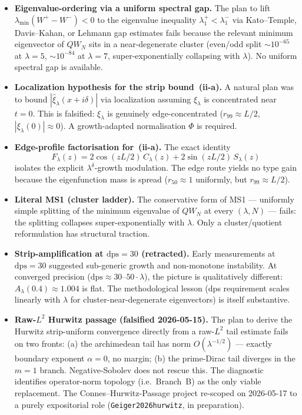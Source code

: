 \documentclass[12pt,a4paper]{article}
\theoremstyle{definition}
\theoremstyle{remark}
\begin{document}
\begin{itemize}
  \item \textbf{Eigenvalue-ordering via a uniform spectral gap.} The plan
    to lift $\lambda_{\min}(W^+-W^-)<0$ to the eigenvalue inequality
    $\lambda_1^+<\lambda_1^-$ via Kato--Temple, Davis--Kahan, or Lehmann
    gap estimates fails because the relevant minimum eigenvector of
    $QW_N$ sits in a near-degenerate cluster (even/odd split
    $\sim\!10^{-65}$ at $\lambda=5$, $\sim\!10^{-84}$ at $\lambda=7$,
    super-exponentially collapsing with $\lambda$). No uniform spectral
    gap is available.

  \item \textbf{Localization hypothesis for the strip bound~(ii-a).} A
    natural plan was to bound
    $|\hat\xi_\lambda(x+i\delta)|$ via localization assuming
    $\xi_\lambda$ is concentrated near $t=0$. This is falsified:
    $\xi_\lambda$ is genuinely edge-concentrated ($r_{99}\approx L/2$,
    $|\xi_\lambda(0)|\approx 0$). A growth-adapted normalisation $\Phi$
    is required.

  \item \textbf{Edge-profile factorisation for~(ii-a).} The exact identity
    \[
      F_\lambda(z)=2\cos(zL/2)\,C_\lambda(z)+2\sin(zL/2)\,S_\lambda(z)
    \]
    isolates the explicit $\lambda^\delta$-growth modulation. The edge
    route yields no type gain because the eigenfunction mass is spread
    ($r_{50}\approx 1$ uniformly, but $r_{99}\approx L/2$).

  \item \textbf{Literal MS1 (cluster ladder).} The conservative form of
    MS1 --- uniformly simple splitting of the minimum eigenvalue of
    $QW_N$ at every $(\lambda,N)$ --- fails: the splitting collapses
    super-exponentially with $\lambda$. Only a cluster/quotient
    reformulation has structural traction.

  \item \textbf{Strip-amplification at $\mathrm{dps}=30$ (retracted).}
    Early measurements at $\mathrm{dps}=30$ suggested sub-generic growth
    and non-monotone instability. At converged precision
    ($\mathrm{dps}\approx 30\text{--}50\cdot\lambda$), the picture is
    qualitatively different: $A_\lambda(0.4)\approx 1.004$ is flat. The
    methodological lesson (dps requirement scales linearly with $\lambda$
    for cluster-near-degenerate eigenvectors) is itself substantive.

  \item \textbf{Raw-$L^2$ Hurwitz passage (falsified 2026-05-15).} The
    plan to derive the Hurwitz strip-uniform convergence directly from a
    raw-$L^2$ tail estimate fails on two fronts: (a) the archimedean
    tail has norm $O(\lambda^{-1/2})$ --- exactly boundary exponent
    $\alpha=0$, no margin; (b) the prime-Dirac tail diverges in the
    $m=1$ branch. Negative-Sobolev does not rescue this. The
    diagnostic identifies operator-norm topology (i.e.\ Branch~B) as the
    only viable replacement. The Connes--Hurwitz-Passage project
    re-scoped on 2026-05-17 to a purely expositorial role
    (\texttt{Geiger2026hurwitz}, in preparation).
\end{itemize}
\end{document}
